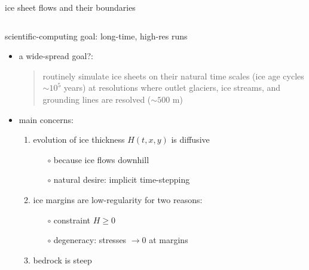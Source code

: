 \documentclass[hide notes,intlimits,usenames,dvipsnames]{beamer}
\begin{document}
\begin{frame}{ice sheet flows and their boundaries}
\begin{columns}
\begin{column}{0.6\textwidth}
\end{column}
\end{columns}
\end{frame}


\begin{frame}{scientific-computing goal: long-time, high-res runs}

\begin{itemize}
\item a wide-spread goal?:
\begin{quote}
routinely simulate ice sheets on their natural time scales (ice age cycles \alert{$\sim 10^5$ years}) at resolutions where outlet glaciers, ice streams, and grounding lines are resolved (\alert{$\sim 500$ m})
\end{quote}
\item main concerns:
    \begin{enumerate}
    \item evolution of ice thickness $H(t,x,y)$ is diffusive
        \begin{itemize}
        \item[$\circ$] because ice flows downhill
        \item[$\circ$] natural desire: implicit time-stepping
        \end{itemize}
    \item ice margins are low-regularity for two reasons:
        \begin{itemize}
        \item[$\circ$] constraint $H\ge 0$
        \item[$\circ$] degeneracy: stresses $\to 0$ at margins
        \end{itemize}
    \item bedrock is steep
    \end{enumerate}
\end{itemize}
\end{frame}
\end{document}
